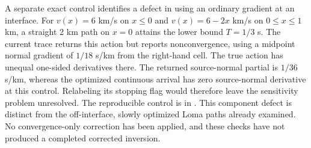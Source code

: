 A separate exact control identifies a defect in using an ordinary gradient
at an interface. For $v(x)=6$ km/s on $x\leq0$ and $v(x)=6-2x$ km/s on
$0\leq x\leq1$ km, a straight 2 km path on $x=0$ attains the lower bound
$T=1/3$ s. The current trace returns this action but reports nonconvergence,
using a midpoint normal gradient of $1/18$ s/km from the right-hand cell.
The true action has unequal one-sided derivatives there. The returned
source-normal partial is $1/36$ s/km, whereas the optimized continuous
arrival has zero source-normal derivative at this control. Relabeling its
stopping flag would therefore leave the sensitivity problem unresolved.
The reproducible control is in .
This component defect is distinct from the off-interface, slowly optimized
Loma paths already examined. No convergence-only correction has been
applied, and these checks have not produced a completed corrected inversion.
